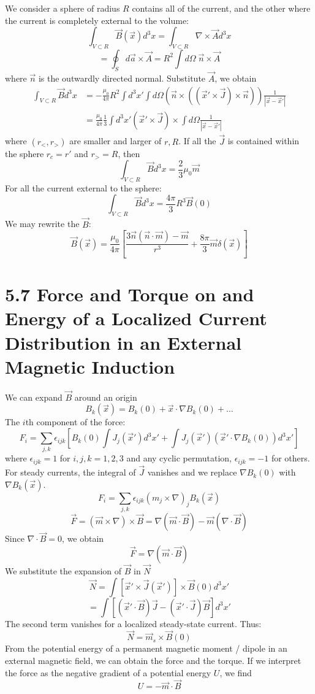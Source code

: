 \documentclass{article}
\begin{document}
	We consider a sphere of radius $R$ contains all of the current, and the other where the current is completely external to the volume:
	\[
	\int_{V \subset R} \vec{B}(\vec{x}) d^3x = \int_{V \subset R} \nabla \times \vec{A} d^3x
	\]
	\[
	= \oint_{S} d\vec{a} \times \vec{A} = R^2 \int d\Omega \; \vec{n} \times \vec{A}
	\]
	where $\vec{n}$ is the outwardly directed normal.
	Substitute $\vec{A}$, we obtain
	\begin{align*}
		\int_{V \subset R} \vec{B} d^3x &= -\frac{\mu_0}{4\pi} R^2 \int d^3x' \int d\Omega (\vec{n} \times ((\vec{x}' \times \vec{J}) \times \vec{n})) \frac{1}{|\vec{x}-\vec{x}'|} \\
		&= \frac{\mu_0}{4\pi} \frac{1}{3} \int d^3x' (\vec{x}' \times \vec{J}) \times \int d\Omega \frac{1}{|\vec{x}-\vec{x}'|}
	\end{align*}
	where $(r_<, r_>)$ are smaller and larger of $r, R$.
	If all the $\vec{J}$ is contained within the sphere $r_c=r'$ and $r_>=R$, then
	\[
	\int_{V \subset R} \vec{B} d^3x = \frac{2}{3}\mu_0 \vec{m}
	\]
	For all the current external to the sphere:
	\[
	\int_{V \subset R} \vec{B} d^3x = \frac{4\pi}{3} R^3 \vec{B}(0)
	\]
	We may rewrite the $\vec{B}$:
	\[
	\vec{B}(\vec{x}) = \frac{\mu_0}{4\pi} \left[ \frac{3\vec{n}(\vec{n}\cdot\vec{m})-\vec{m}}{r^3} + \frac{8\pi}{3} \vec{m} \delta(\vec{x}) \right]
	\]
	
	\section*{5.7 Force and Torque on and Energy of a Localized Current Distribution in an External Magnetic Induction}
	We can expand $\vec{B}$ around an origin
	\[
	B_k(\vec{x}) = B_k(0) + \vec{x} \cdot \nabla B_k(0) + \dots
	\]
	The $i$th component of the force:
	\[
	F_i = \sum_{j,k} \epsilon_{ijk} \left[ B_k(0) \int J_j(\vec{x}') d^3x' + \int J_j(\vec{x}')(\vec{x}' \cdot \nabla B_k(0)) d^3x' \right]
	\]
	where $\epsilon_{ijk}=1$ for $i,j,k=1,2,3$ and any cyclic permutation, $\epsilon_{ijk}=-1$ for others.
	For steady currents, the integral of $\vec{J}$ vanishes and we replace $\nabla B_k(0)$ with $\nabla B_k(\vec{x})$.
	\[
	F_i = \sum_{j,k} \epsilon_{ijk} (m_j \times \nabla)_j B_k(\vec{x})
	\]
	\[
	\vec{F} = (\vec{m} \times \nabla) \times \vec{B} = \nabla(\vec{m}\cdot\vec{B}) - \vec{m}(\nabla \cdot \vec{B})
	\]
	Since $\nabla \cdot \vec{B} = 0$, we obtain
	\[
	\vec{F} = \nabla(\vec{m}\cdot\vec{B})
	\]
	We substitute the expansion of $\vec{B}$ in $\vec{N}$
	\[
	\vec{N} = \int [\vec{x}' \times \vec{J}(\vec{x}')] \times \vec{B}(0) d^3x'
	\]
	\[
	= \int [(\vec{x}' \cdot \vec{B}) \vec{J} - (\vec{x}' \cdot \vec{J}) \vec{B}] d^3x'
	\]
	The second term vanishes for a localized steady-state current.
	Thus:
	$$ \vec{N} = \vec{m}_s \times \vec{B}(0) $$
	From the potential energy of a permanent magnetic moment / dipole in an external magnetic field, we can obtain the force and the torque.
	If we interpret the force as the negative gradient of a potential energy $U$, we find
	$$ U = -\vec{m} \cdot \vec{B} $$
	
\end{document}
